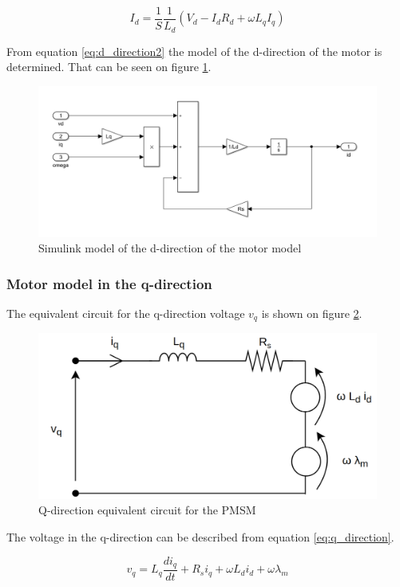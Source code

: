 \begin{equation}
    \label{eq:d_direction2}
    I_d = \frac{1}{S} \frac{1}{L_d} (V_d - I_d R_d + \omega L_q I_q)
\end{equation}

From equation \ref{eq:d_direction2} the model of the d-direction of the motor is determined. That can be seen on figure \ref{fig:simulink_d_direction}.

\begin{figure}[H]
	\centering
	\includegraphics[width=0.8\linewidth]{pictures/control/simulink_d_direction.PNG}
	\caption{Simulink model of the d-direction of the motor model}
	\label{fig:simulink_d_direction}
\end{figure}



\subsubsection{Motor model in the q-direction}
The equivalent circuit for the q-direction voltage $v_q$ is shown on figure \ref{fig:vq}.

\begin{figure}[H]
	\centering
	\includegraphics[width=0.6\linewidth]{pictures/control/vq.png}
	\caption{Q-direction equivalent circuit for the PMSM}
	\label{fig:vq}
\end{figure}

The voltage in the q-direction can be described from equation \ref{eq:q_direction}.

\begin{equation}
\label{eq:q_direction}
    v_q = L_q\frac{d i_q}{dt} + R_s i_q + \omega L_d i_d + \omega \lambda_m
\end{equation}

